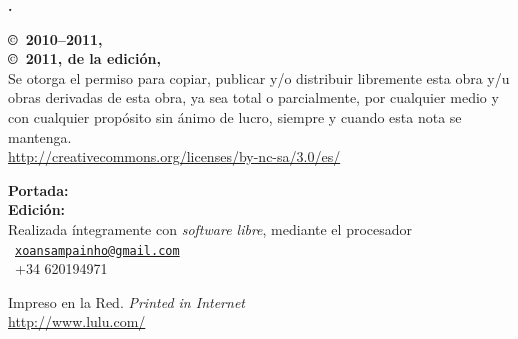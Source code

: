 \noindent
\textbf{\titlename. \subtitlename}\\
\authorname

\footnotesize

\bigskip\bigskip\noindent
\textbf{\copyright\ 2010--2011, \authorname}\\
\textbf{\copyright\ 2011, de la edición, \editorname}\\
Se otorga el permiso para copiar, publicar y/o distribuir libremente esta obra y/u obras derivadas de esta obra, ya sea total o parcialmente, por cualquier medio y con cualquier propósito sin ánimo de lucro, siempre y cuando esta nota se mantenga.\\
{\selectfont\url{http://creativecommons.org/licenses/by-nc-sa/3.0/es/}}

\bigskip\noindent
\textbf{Portada:} \coverauthorname\\
\textbf{Edición:} \editorname\\
Realizada íntegramente con \emph{software libre}, mediante el procesador \emph{\LaTeXe}\\
\Letter\ {\selectfont\href{mailto:xoansampainho@gmail.com}{\nolinkurl{xoansampainho@gmail.com}}}\\
\Telefon\ +34 620194971

\bigskip\noindent
Impreso en la Red. \emph{Printed in Internet}\\
{\selectfont\url{http://www.lulu.com/}}

\normalsize

\endinput
